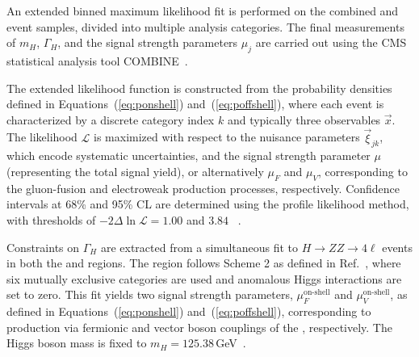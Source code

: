 
An extended binned maximum likelihood fit is performed on the combined \onshell and \offshell event samples, divided into multiple analysis categories. The final measurements of $m_H$, $\Gamma_H$, and the signal strength parameters $\mu_{j}$ are carried out using the CMS statistical analysis tool COMBINE~\cite{CMS:2024onh}.

The extended likelihood function is constructed from the probability densities defined in Equations~(\ref{eq:ponshell}) and~(\ref{eq:poffshell}), where each event is characterized by a discrete category index $k$ and typically three observables $\vec{x}$. The likelihood $\mathcal{L}$ is maximized with respect to the nuisance parameters $\vec{\xi}_{jk}$, which encode systematic uncertainties, and the signal strength parameter $\mu$ (representing the total signal yield), or alternatively $\mu_F$ and $\mu_V$, corresponding to the gluon-fusion and electroweak production processes, respectively. Confidence intervals at 68\% and 95\% CL are determined using the profile likelihood method, with thresholds of $-2\Delta\ln\mathcal{L} = 1.00$ and $3.84$ ~\cite{Wilks:1938dza}.

Constraints on $\Gamma_H$ are extracted from a simultaneous fit to $H \to ZZ \to 4\ell$ events in both the \onshell and \offshell regions. The \onshell region follows Scheme 2 as defined in Ref.~\cite{CMS:2021nnc}, where six mutually exclusive categories are used and anomalous Higgs interactions are set to zero. This fit yields two signal strength parameters, $\mu^\text{on-shell}_{F}$ and $\mu^\text{on-shell}_{V}$, as defined in Equations~(\ref{eq:ponshell}) and~(\ref{eq:poffshell}), corresponding to production via fermionic and vector boson couplings of the \Hboson, respectively. The Higgs boson mass is fixed to $m_H = 125.38$\,GeV~\cite{Sirunyan:2020xwk}.

